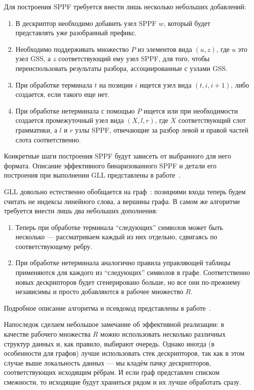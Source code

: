 Для построения SPPF требуется внести лишь несколько небольших добавлений:

\begin{enumerate}
  \item В дескриптор необходимо добавить узел SPPF $ w $, который будет представлять уже разобранный префикс. 
  \item Необходимо поддерживать множество $ P $ из элементов вида $ (u, z) $, где $ u $ это узел GSS, а $ z $ соответствующий ему узел SPPF, для того, чтобы переиспользовать результаты разбора, ассоциированные с узлами GSS. 
  \item При обработке терминала $ t $ на позиции $ i $ ищется узел вида $ (t, i, i + 1) $, либо создается, если такого еще нет.
  \item При обработке нетерминала с помощью $ P $ ищется или при необходимости создается промежуточный узел вида $ (X, l, r) $, где $ X $ соответствующий слот грамматики, а $ l $ и $ r $ узлы SPPF, отвечающие за разбор левой и правой частей слота соответственно.
\end{enumerate}

Конкретные шаги построения SPPF будут зависеть от выбранного для него формата. Описание эффективного бинаризованного SPPF и детали его построения при выполнении GLL представлены в работе~\cite{10.1007/978-3-662-46663-6_5}.

GLL довольно естественно обобщается на граф~\cite{Grigorev:2017:CPQ:3166094.3166104}: позициями входа теперь будем считать не индексы линейного слова, а вершины графа. В самом же алгоритме требуется внести лишь два небольших дополнения:

\begin{enumerate}
  \item Теперь при обработке терминала ``следующих'' символов может быть несколько --- рассматриваем каждый из них отдельно, сдвигаясь по соответствующему ребру.
  \item При обработке нетерминала аналогично правила управляющей таблицы применяются  для каждого из ``следующих'' символов в графе. Соответственно новых дескрипторов будет сгенерировано больше, но все они по-прежнему независимы и просто добавляются в рабочее множество $ R $.  
\end{enumerate}

Подробное описание алгоритма и псевдокод представлены в работе~\cite{Grigorev:2017:CPQ:3166094.3166104}. 

Напоследок сделаем небольшое замечание об эффективной реализации: в качестве рабочего множества $ R $ можно использовать несколько различных структур данных и, как правило, выбирают очередь. Однако иногда (в особенности для графов) лучше использовать стек дескрипторов, так как в этом случае выше локальность данных --- мы кладём пачку дескрипторов, соответствующих исходящим рёбрам. И если граф представлен списком смежности, то исходящие будут храниться рядом и их лучше обработать сразу.

